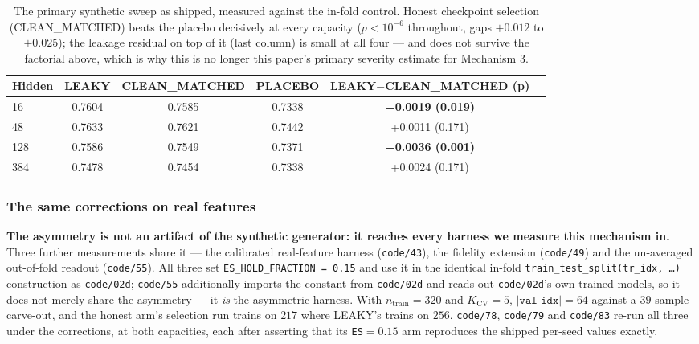 \documentclass[10pt]{article} %
\begin{document}
\begin{table}[!ht]
\centering
\small
\begin{tabular}{lccccc}
\toprule
Hidden & LEAKY & CLEAN\_MATCHED & PLACEBO & LEAKY$-$CLEAN\_MATCHED (p) \\
\midrule
16 & 0.7604 & 0.7585 & 0.7338 & \textbf{+0.0019 (0.019)} \\
48 & 0.7633 & 0.7621 & 0.7442 & +0.0011 (0.171) \\
128 & 0.7586 & 0.7549 & 0.7371 & \textbf{+0.0036 (0.001)} \\
384 & 0.7478 & 0.7454 & 0.7338 & +0.0024 (0.171) \\
\bottomrule
\end{tabular}
\caption{The primary synthetic sweep as shipped, measured against the in-fold
control. Honest checkpoint selection (CLEAN\_MATCHED) beats the placebo
decisively at every capacity ($p<10^{-6}$ throughout, gaps $+0.012$ to
$+0.025$); the leakage residual on top of it (last column) is small at all four
--- and does not survive the factorial above, which is why this is no longer
this paper's primary severity estimate for Mechanism 3.}
\label{tab:m3-primary}
\end{table}

\subsubsection{The same corrections on real features}

\textbf{The asymmetry is not an artifact of the synthetic generator: it reaches
every harness we measure this mechanism in.} Three further measurements share
it --- the calibrated real-feature harness (\texttt{code/43}), the fidelity
extension (\texttt{code/49}) and the un-averaged out-of-fold readout
(\texttt{code/55}). All three set \texttt{ES\_HOLD\_FRACTION = 0.15} and use it
in the identical in-fold \texttt{train\_test\_split(tr\_idx, \dots)}
construction as \texttt{code/02d}; \texttt{code/55} additionally imports the
constant from \texttt{code/02d} and reads out \texttt{code/02d}'s own trained
models, so it does not merely share the asymmetry --- it \emph{is} the
asymmetric harness. With $n_{\text{train}}=320$ and $K_{\text{CV}}=5$,
$|\texttt{val\_idx}|=64$ against a $39$-sample carve-out, and the honest arm's
selection run trains on $217$ where LEAKY's trains on $256$. \texttt{code/78},
\texttt{code/79} and \texttt{code/83} re-run all three under the corrections,
at both capacities, each after asserting that its \texttt{ES}$=0.15$ arm
reproduces the shipped per-seed values exactly.
\end{document}
